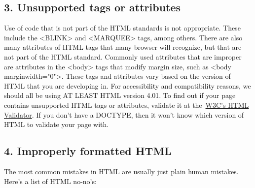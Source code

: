 \documentclass[12pt]{report}
\renewcommand{\_}{\kern-1.5pt\textunderscore\kern-1.5pt}
\begin{document}
\begin{adjustwidth}{0.2in}{0.84in}
\subsection*{3. Unsupported tags or attributes }
\end{adjustwidth}

\begin{adjustwidth}{0.2in}{0.84in}
\textcolor[HTML]{0D0D0D}{Use of code that is not part of the HTML standards is not appropriate. These include the <BLINK> and <MARQUEE> tags, among others. There are also many attributes of HTML tags that many browser will recognize, but that are not part of the HTML standard. Commonly used attributes that are improper are attributes in the <body> tags that modify margin size, such as <body marginwidth="0">. These tags and attributes vary based on the version of HTML that you are developing in. For accessibility and compatibility reasons, we should all be using AT LEAST HTML version 4.01. To find out if your page contains unsupported HTML tags or attributes, validate it at the \href{http://validator.w3.org/}{W3C's HTML Validator}. If you don't have a DOCTYPE, then it won't know which version of HTML to validate your page with.}\par

\end{adjustwidth}

\begin{adjustwidth}{0.2in}{0.84in}
\subsection*{4. Improperly formatted HTML}
\end{adjustwidth}

\begin{adjustwidth}{0.2in}{0.84in}
\textcolor[HTML]{0D0D0D}{The most common mistakes in HTML are usually just plain human mistakes. Here's a list of HTML no-no's:}\par

\end{adjustwidth}
\end{document}
